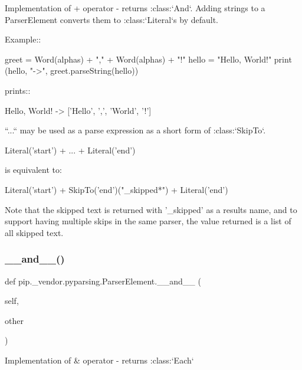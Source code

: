\begin{DoxyVerb}Implementation of + operator - returns :class:`And`. Adding strings to a ParserElement
converts them to :class:`Literal`s by default.

Example::

    greet = Word(alphas) + "," + Word(alphas) + "!"
    hello = "Hello, World!"
    print (hello, "->", greet.parseString(hello))

prints::

    Hello, World! -> ['Hello', ',', 'World', '!']

``...`` may be used as a parse expression as a short form of :class:`SkipTo`.

    Literal('start') + ... + Literal('end')

is equivalent to:

    Literal('start') + SkipTo('end')("_skipped*") + Literal('end')

Note that the skipped text is returned with '_skipped' as a results name,
and to support having multiple skips in the same parser, the value returned is
a list of all skipped text.
\end{DoxyVerb}
 \mbox{\label{classpip_1_1__vendor_1_1pyparsing_1_1ParserElement_a8d31542ee1c485f963344eeb688dcebe}} 
\subsubsection{\texorpdfstring{\+\_\+\+\_\+and\+\_\+\+\_\+()}{\_\_and\_\_()}}
{\footnotesize\ttfamily def pip.\+\_\+vendor.\+pyparsing.\+Parser\+Element.\+\_\+\+\_\+and\+\_\+\+\_\+ (\begin{DoxyParamCaption}\item[{}]{self,  }\item[{}]{other }\end{DoxyParamCaption})}

\begin{DoxyVerb}Implementation of & operator - returns :class:`Each`
\end{DoxyVerb}
 \mbox{\label{classpip_1_1__vendor_1_1pyparsing_1_1ParserElement_ae345dfb10ea6a1e9c77120e86129ab16}} 
